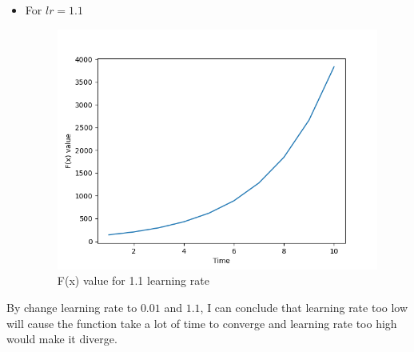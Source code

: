 \documentclass[12pt]{article}
\begin{document}
\begin{itemize}
    \item For \(lr = 1.1\)
        \begin{figure}[h!]
            \centering
            \includegraphics[width=0.7\linewidth]{images/Lab1/LR11.png}
            \caption{F(x) value for 1.1 learning rate}
        \end{figure}
\end{itemize}

By change learning rate to \(0.01\) and \(1.1\), I can conclude that learning rate too low will cause the function take a lot of time to converge and learning rate too high would make it diverge.
\end{document}

